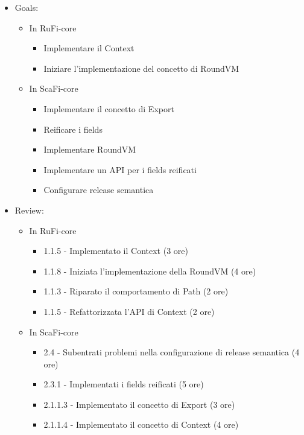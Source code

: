 \documentclass[12pt, a4paper]{article}
\begin{document}
\begin{itemize}
    \item Goals:
          \begin{itemize}
              \color{teal}
              \item In RuFi-core
                    \begin{itemize}
                        \item Implementare il Context
                        \item Iniziare l'implementazione del concetto di RoundVM
                    \end{itemize}
                    \color{cyan}
              \item In ScaFi-core
                    \begin{itemize}
                        \item Implementare il concetto di Export
                        \item Reificare i fields
                        \item Implementare RoundVM
                        \item Implementare un API per i fields reificati
                        \item Configurare release semantica
                    \end{itemize}
          \end{itemize}
    \item Review:
          \begin{itemize}
              \color{teal}
              \item In RuFi-core
                    \begin{itemize}
                        \item 1.1.5 - Implementato il Context (3 ore)
                        \item 1.1.8 - Iniziata l'implementazione della RoundVM (4 ore)
                        \item 1.1.3 - Riparato il comportamento di Path (2 ore)
                        \item 1.1.5 - Refattorizzata l'API di Context (2 ore)
                    \end{itemize}
                    \color{cyan}
              \item In ScaFi-core
                    \begin{itemize}
                        \item 2.4 - Subentrati problemi nella configurazione di release semantica (4 ore)
                        \item 2.3.1 - Implementati i fields reificati (5 ore)
                        \item 2.1.1.3 - Implementato il concetto di Export (3 ore)
                        \item 2.1.1.4 - Implementato il concetto di Context (4 ore)
                    \end{itemize}
          \end{itemize}
\end{itemize}
\end{document}
